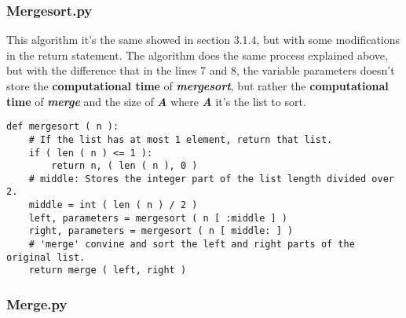 {\bfseries\itshape\color{armygreen}{Observation:}} {\itshape{}} \hfill \break

{\bfseries\itshape\color{armygreen}{Observation:}} {\itshape{}}

\pagebreak

\subsubsection{Mergesort.py}

This algorithm it's the same showed in section 3.1.4, but with some modifications in the return statement. The algorithm does the same process explained above, but with the difference that in the lines 7 and 8, the variable parameters doesn't store the {\bfseries computational time} of {\bfseries\itshape mergesort}, but rather the {\bfseries computational time} of {\bfseries\itshape merge} and the size of {\bfseries\itshape A} where {\bfseries\itshape A} it's the list to sort. \hfill \break

\begin{lstlisting}
def mergesort ( n ):
    # If the list has at most 1 element, return that list.
    if ( len ( n ) <= 1 ):
        return n, ( len ( n ), 0 )
    # middle: Stores the integer part of the list length divided over 2.
    middle = int ( len ( n ) / 2 )
    left, parameters = mergesort ( n [ :middle ] )
    right, parameters = mergesort ( n [ middle: ] )
    # 'merge' convine and sort the left and right parts of the original list.
    return merge ( left, right )
\end{lstlisting}

\pagebreak

\subsubsection{Merge.py}

